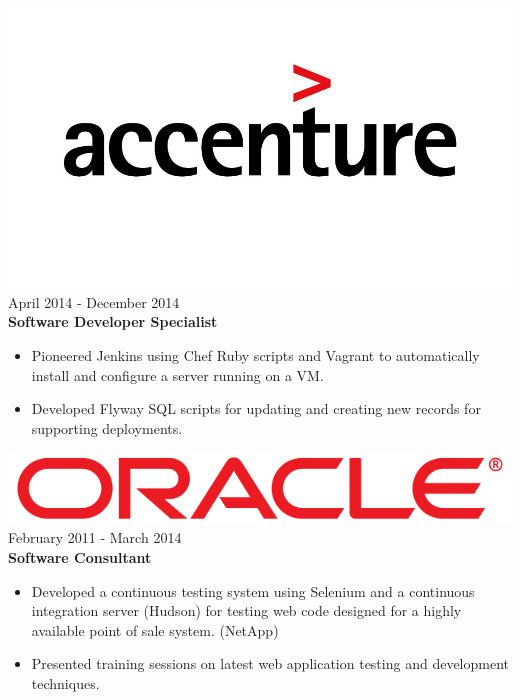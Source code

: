 \documentclass[12pt, line, margin]{res}
\begin{document}
\begin{resume}
	      {\sl  \includegraphics[scale=0.1, trim=110 200 110 120]{resume_images/accenture-logo.jpg}} \hfill April 2014 - December 2014 \\
                \textbf{Software Developer Specialist}
                 \begin{itemize}  \itemsep -2pt %
                \item   Pioneered Jenkins using Chef Ruby scripts and Vagrant\newline
                               to automatically install and configure a server running on a VM.
	      \item   Developed Flyway SQL scripts for updating and creating new 
                               records for supporting deployments.
                \end{itemize}

                {\sl \includegraphics[scale=0.1]{resume_images/663px-Oracle_logo.png}} \hfill            February 2011 - March 2014 \\
                \textbf{Software Consultant}
                \begin{itemize}  \itemsep -2pt %
	      \item Developed a continuous testing system using Selenium
                               and a continuous integration server (Hudson) for testing web code designed
                               for a highly available point of sale system. (NetApp)
	      \item Presented training sessions on latest web application testing \newline
                               and development techniques.
                 \end{itemize} 


\end{resume}
\end{document}
